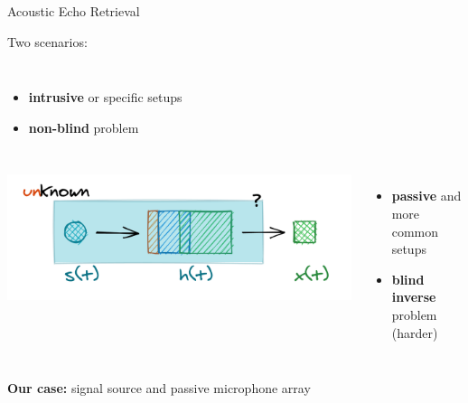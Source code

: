 \begin{frame}[t]{Acoustic Echo Retrieval \hfill\faBook}
\begin{block}{Two scenarios:}
\begin{columns}[onlytextwidth]
        \begin{itemize}
            \small
            \item[\faVolumeUp] \textbf{intrusive} or specific setups
            \item[\faEye] \textbf{non-blind} problem
            \\
        \end{itemize}
    \end{columns}
    \end{block}

    \pause

    \begin{mycontriblock}
        \begin{columns}[onlytextwidth]

        \centering
        \includegraphics[width=.9\textwidth]{./figures/passive.png}

        \begin{itemize}
            \small
            \item[\faMicrophone] \textbf{passive} and more common setups
            \item[\faEyeSlash] \textbf{blind inverse} problem (harder)
            \\
        \end{itemize}
    \end{columns}
    \end{mycontriblock}

    \pause
    \begin{center}
        \textcolor{myred}{\textbf{Our case:} signal source and passive microphone array}
    \end{center}

\end{frame}

